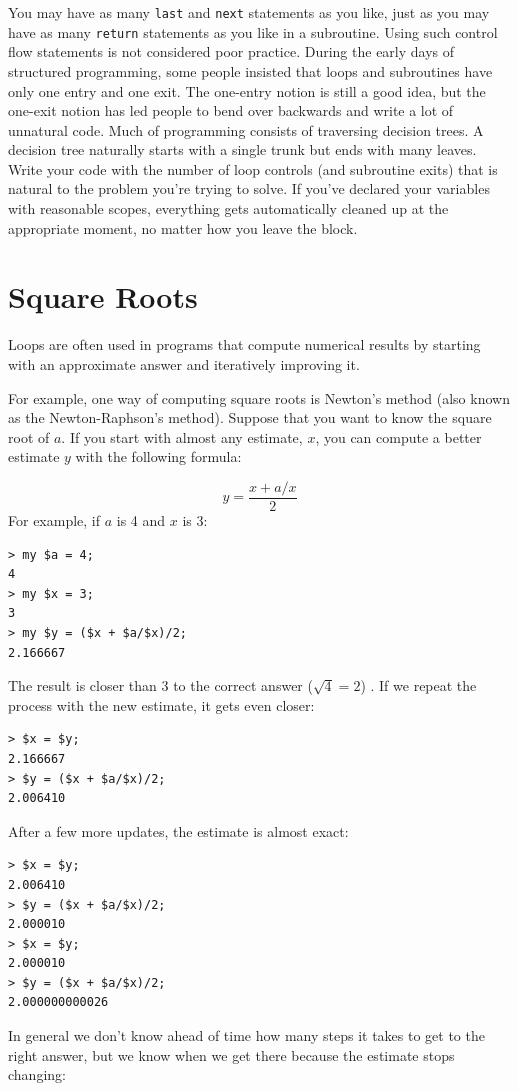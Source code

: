 You may have as many {\tt last} and {\tt next} statements as you 
like, just as you may have as many {\tt return} statements as 
you like in a subroutine. Using such control flow statements 
is not considered poor 
practice. During the early days of structured programming, 
some people insisted that loops and subroutines have only one 
entry and one exit. The one-entry notion is still a good idea, 
but the one-exit notion has led people to bend over backwards 
and write a lot of unnatural code. Much of programming consists of traversing 
decision trees. A decision tree naturally starts with a single 
trunk but ends with many leaves. Write your code with the number 
of loop controls (and subroutine exits) that is natural to the 
problem you're trying to solve. If you've declared your variables 
with reasonable scopes, everything gets automatically cleaned up 
at the appropriate moment, no matter how you leave the block.


\section{Square Roots}
\label{squareroot}

Loops are often used in programs that compute
numerical results by starting with an approximate answer and
iteratively improving it.

For example, one way of computing square roots is Newton's 
method (also known as the Newton-Raphson's method).
Suppose that you want to know the square root of $a$.  If you start
with almost any estimate, $x$, you can compute a better
estimate $y$ with the following formula:

\[ y = \frac{x + a/x}{2} \]
%
For example, if $a$ is 4 and $x$ is 3:

\begin{verbatim}
> my $a = 4;
4
> my $x = 3;
3
> my $y = ($x + $a/$x)/2;
2.166667
\end{verbatim}
%
The result is closer than 3 to the correct answer 
($\sqrt{4} = 2$) .  If we repeat the process with the new estimate, it gets even closer:

\begin{verbatim}
> $x = $y;
2.166667
> $y = ($x + $a/$x)/2;
2.006410
\end{verbatim}
%
After a few more updates, the estimate is almost exact:

\begin{verbatim}
> $x = $y;
2.006410
> $y = ($x + $a/$x)/2;
2.000010
> $x = $y;
2.000010
> $y = ($x + $a/$x)/2;
2.000000000026
\end{verbatim}
%
In general we don't know ahead of time how many steps it takes
to get to the right answer, but we know when we get there
because the estimate stops changing:

